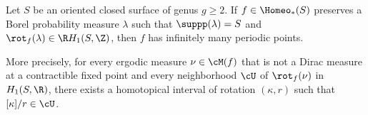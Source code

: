 \begin{theo} \label{th:main}
Let $ S$ be an oriented closed surface of genus $g\geq 2$. If $f\in \Homeo_*(S)$ preserves a Borel probability measure $\lambda$ such that $\suppp(\lambda)=S$ and $\rot_{f}(\lambda)\in \R H_1(S,\Z)$, then $f$ has infinitely many periodic points.

More precisely, for every ergodic measure $\nu\in\cM(f)$ that is not a Dirac measure at a contractible fixed point and every neighborhood $\cU$ of $\rot_{f}(\nu)$ in $H_1(S,\R)$, there exists a homotopical interval of rotation $(\kappa, r)$ such that $[\kappa]/r\in \cU$.
\end{theo}
